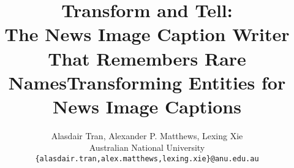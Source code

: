 \documentclass[10pt,twocolumn,letterpaper]{article}
\begin{document}
\title{Transform and Tell:\\The News Image Caption Writer That Remembers Rare Names}
\title{Transforming Entities for News Image Captions}

\author{Alasdair Tran, Alexander P. Matthews, Lexing Xie\\
Australian National University\\
{\tt\small \{alasdair.tran,alex.matthews,lexing.xie\}@anu.edu.au}
}

\maketitle









{\small


}
\end{document}
